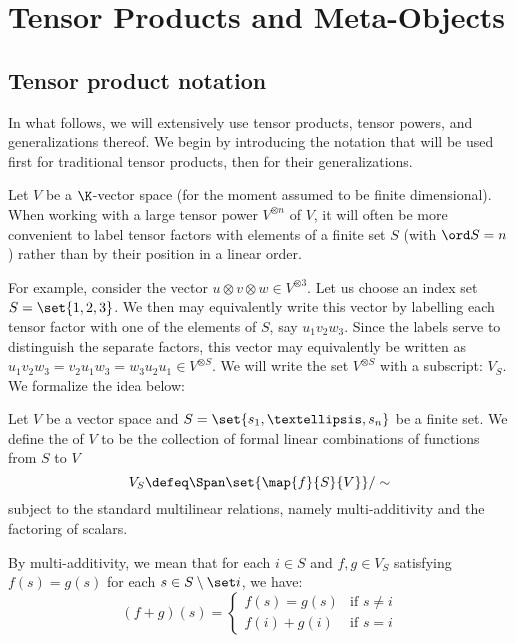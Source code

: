 \chapter{Tensor Products and Meta-Objects}
\label{ch:intro}

\section{Tensor product notation}
In what follows, we will extensively use tensor products, tensor powers, and
generalizations thereof. We begin by introducing the notation that will be used
first for traditional tensor products, then for their generalizations.

Let $V$ be a $\K$-vector space (for the moment assumed to be finite
dimensional). When working with a large tensor power $V^{\otimes n}$ of $V$, it
will often be more convenient to label tensor factors with elements of a finite
set $S$ (with $\ord S = n$) rather than by their position in a linear order.

For example, consider the vector $u \otimes v \otimes w \in V^{\otimes 3}$. Let
us choose an index set $S = \set{1,2,3}$. We then may equivalently write this
vector by labelling each tensor factor with one of the elements of $S$, say
$u_1v_2w_3$. Since the labels serve to distinguish the separate factors, this
vector may equivalently be written as $u_1v_2w_3 = v_2u_1w_3 = w_3u_2u_1 \in
V^{\otimes S}$. We will write the set $V^{\otimes S}$ with a subscript: $V_S$.
We formalize the idea below:

\begin{definition}
        Let $V$ be a vector space and $S = \set{s_1,…, s_n}$ be a finite
        set. We define the  of $V$ to be the
        collection of formal linear combinations of functions from $S$ to $V$
        \begin{equation}\label{eq:indexed_tensor}
                V_S \defeq \Span\set{\map {f} {S} {V}}/\sim
        \end{equation}
        subject to the standard multilinear relations, namely multi-additivity
        and the factoring of scalars.

        By multi-additivity, we mean that for each $i\in S$ and $f, g \in V_S$
        satisfying $f(s) = g(s)$ for each $s \in S\setminus\set i$, we have:
        \begin{equation}
                \label{eq:tensor_additive}
                (f + g)(s) = 
                        \begin{cases}
                                f(s) = g(s) & \text{if $s \neq i$}\\
                                f(i) + g(i) & \text{if $s = i$}
                        \end{cases}
        \end{equation}
\end{definition}

